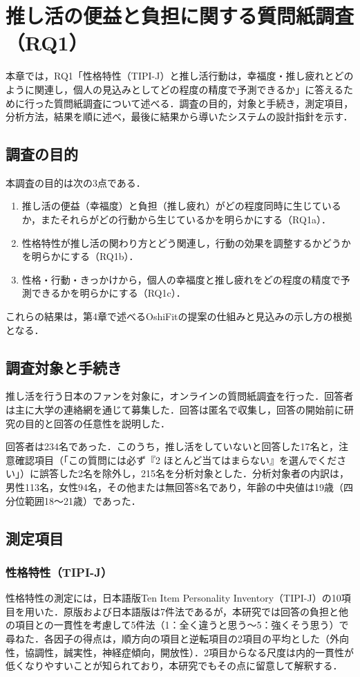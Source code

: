 \chapter{推し活の便益と負担に関する質問紙調査（RQ1）}
本章では，RQ1「性格特性（TIPI-J）と推し活行動は，幸福度・推し疲れとどのように関連し，個人の見込みとしてどの程度の精度で予測できるか」に答えるために行った質問紙調査について述べる．調査の目的，対象と手続き，測定項目，分析方法，結果を順に述べ，最後に結果から導いたシステムの設計指針を示す．

\section{調査の目的}
本調査の目的は次の3点である．
\begin{enumerate}
\item 推し活の便益（幸福度）と負担（推し疲れ）がどの程度同時に生じているか，またそれらがどの行動から生じているかを明らかにする（RQ1a）．
\item 性格特性が推し活の関わり方とどう関連し，行動の効果を調整するかどうかを明らかにする（RQ1b）．
\item 性格・行動・きっかけから，個人の幸福度と推し疲れをどの程度の精度で予測できるかを明らかにする（RQ1c）．
\end{enumerate}
これらの結果は，第4章で述べるOshiFitの提案の仕組みと見込みの示し方の根拠となる．

\section{調査対象と手続き}
推し活を行う日本のファンを対象に，オンラインの質問紙調査を行った．回答者は主に大学の連絡網を通じて募集した．回答は匿名で収集し，回答の開始前に研究の目的と回答の任意性を説明した．

回答者は234名であった．このうち，推し活をしていないと回答した17名と，注意確認項目（「この質問には必ず『2 ほとんど当てはまらない』を選んでください」）に誤答した2名を除外し，215名を分析対象とした．分析対象者の内訳は，男性113名，女性94名，その他または無回答8名であり，年齢の中央値は19歳（四分位範囲18〜21歳）であった．

\section{測定項目}
\subsection{性格特性（TIPI-J）}
性格特性の測定には，日本語版Ten Item Personality Inventory（TIPI-J）\cite{oshio2012}の10項目を用いた．原版\cite{gosling2003}および日本語版は7件法であるが，本研究では回答の負担と他の項目との一貫性を考慮して5件法（1：全く違うと思う〜5：強くそう思う）で尋ねた．各因子の得点は，順方向の項目と逆転項目の2項目の平均とした（外向性，協調性，誠実性，神経症傾向，開放性）．2項目からなる尺度は内的一貫性が低くなりやすいことが知られており\cite{gosling2003,oshio2012}，本研究でもその点に留意して解釈する．

